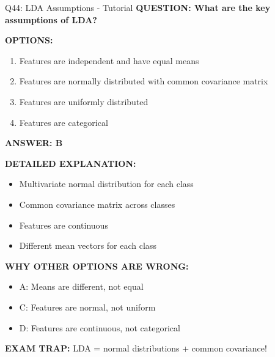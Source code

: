 \documentclass[8pt]{beamer}
\begin{document}
	\begin{frame}{Q44: LDA Assumptions - Tutorial}
		\fontsize{6.5}{7.5}\selectfont
		\textbf{QUESTION: What are the key assumptions of LDA?}
		
		\vspace{0.1cm}
		\textbf{OPTIONS:}
		\begin{enumerate}
			\item Features are independent and have equal means
			\item Features are normally distributed with common covariance matrix
			\item Features are uniformly distributed
			\item Features are categorical
		\end{enumerate}
		
		\vspace{0.1cm}
		\textcolor{myblue}{\textbf{ANSWER: B}}
		
		\vspace{0.1cm}
		\textbf{DETAILED EXPLANATION:}
		\begin{itemize}
			\item Multivariate normal distribution for each class
			\item Common covariance matrix across classes
			\item Features are continuous
			\item Different mean vectors for each class
		\end{itemize}
		
		\vspace{0.1cm}
		\textcolor{myred}{\textbf{WHY OTHER OPTIONS ARE WRONG:}}
		\begin{itemize}
			\item \textcolor{myred}{A:} Means are different, not equal
			\item \textcolor{myred}{C:} Features are normal, not uniform
			\item \textcolor{myred}{D:} Features are continuous, not categorical
		\end{itemize}
		
		\textcolor{myred}{\textbf{EXAM TRAP:}} LDA = \textcolor{myblue}{normal distributions + common covariance}!
	\end{frame}
	
\end{document}
